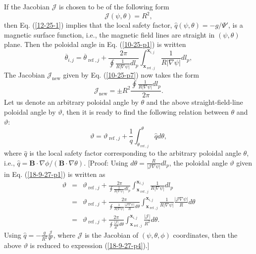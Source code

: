 \documentclass{llncs}
\newcommand{\tmop}[1]{\ensuremath{\operatorname{#1}}}
\begin{document}
If the Jacobian $\mathcal{J}$ is chosen to be of the following form
\[ \mathcal{J} (\psi, \theta) = R^2, \]
then Eq. (\ref{12-25-1}) implies that the local safety factor, $\hat{q} (\psi,
\theta) = - g / \Psi'$, is a magnetic surface function, i.e., the magnetic
field lines are straight in $(\psi, \theta)$ plane. Then the poloidal angle in
Eq. (\ref{10-25-p1}) is written
\begin{equation}
  \label{18-9-27-p1} \overline{\theta}_{i, j} = \overline{\theta}_{\tmop{ref},
  j} + \frac{2 \pi}{\oint \frac{1}{R | \nabla \psi |} d l_p}
  \int_{\mathbf{x}_{\tmop{ref}, j}}^{\mathbf{x}_{i, j}} \frac{1}{R | \nabla
  \psi |} d l_p,
\end{equation}
The Jacobian $\mathcal{J}_{\tmop{new}}$ given by Eq. (\ref{10-25-p7}) now
takes the form
\begin{equation}
  \mathcal{J}_{\tmop{new}} = \pm R^2 \frac{\oint \frac{1}{R | \nabla \psi |} d
  l_p}{2 \pi} .
\end{equation}
Let us denote an arbitrary poloidal angle by $\theta$ and the above
straight-field-line poloidal angle by $\vartheta$, then it is ready to find
the following relation between $\theta$ and $\vartheta$:
\begin{equation}
  \label{18-9-27-p4} \vartheta = \vartheta_{\tmop{ref}, j} + \frac{1}{q}
  \int_{\theta_{\tmop{ref}, j}}^{\theta} \hat{q} d \theta,
\end{equation}
where $\hat{q}$ is the local safety factor corresponding to the arbitrary
poloidal angle $\theta$, i.e., $\hat{q} =\mathbf{B} \cdot \nabla \phi /
(\mathbf{B} \cdot \nabla \theta)$. [Proof: Using $d \theta =
\frac{R}{|\mathcal{J} \nabla \psi |} d l_p$, the poloidal angle $\vartheta$
given in Eq. (\ref{18-9-27-p1}) is written as
\begin{eqnarray}
  \vartheta & = & \vartheta_{\tmop{ref}, j} + \frac{2 \pi}{\oint \frac{1}{R |
  \nabla \psi |} d l_p} \int_{\mathbf{x}_{\tmop{ref}, j}}^{\mathbf{x}_{i, j}}
  \frac{1}{R | \nabla \psi |} d l_p \nonumber\\
  & = & \vartheta_{\tmop{ref}, j} + \frac{2 \pi}{\oint \frac{1}{R | \nabla
  \psi |} \frac{| \mathcal{J} \nabla \psi |}{R} d \theta}
  \int_{\mathbf{x}_{\tmop{ref}, j}}^{\mathbf{x}_{i, j}} \frac{1}{R | \nabla
  \psi |} \frac{| \mathcal{J} \nabla \psi |}{R} d \theta \nonumber\\
  & = & \vartheta_{\tmop{ref}, j} + \frac{2 \pi}{\oint \frac{| \mathcal{J}
  |}{R^2} d \theta} \int_{\mathbf{x}_{\tmop{ref}, j}}^{\mathbf{x}_{i, j}}
  \frac{| \mathcal{J} |}{R^2} d \theta . 
\end{eqnarray}
Using $\hat{q} = - \frac{g}{R^2}  \frac{\mathcal{J}}{\Psi'}$, where
$\mathcal{J}$ is the Jacobian of $(\psi, \theta, \phi)$ coordinates, then the
above $\vartheta$ is reduced to expression (\ref{18-9-27-p4}).]
\end{document}
